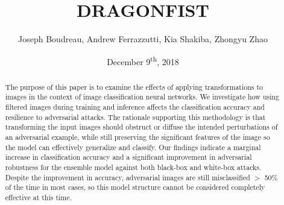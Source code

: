 \documentclass[11pt,twocolumn]{IEEEtran}
\title{DRAGONFIST}
\author{Joseph Boudreau, Andrew Ferrazzutti, Kia Shakiba, Zhongyu Zhao}
\date{December 9\textsuperscript{th}, 2018}
\begin{document}
	\maketitle

	\begin{abstract}
		The purpose of this paper is to examine the effects of applying transformations to images in the context of image classification neural networks.
		We investigate how using filtered images during training and inference affects the classification accuracy and resilience to adversarial attacks.
		The rationale supporting this methodology is that transforming the input images should obstruct or diffuse the intended perturbations of an adversarial example, while still preserving the significant features of the image so the model can effectively generalize and classify.
		Our findings indicate a marginal increase in classification accuracy and a significant improvement in adversarial robustness for the ensemble model against both black-box and white-box attacks.
		Despite the improvement in accuracy, adversarial images are still misclassified \(>\) 50\% of the time in most cases, so this model structure cannot be considered completely effective at this time.
	\end{abstract}

	
	
	
    
	
	
	
	

	
	{}

	
\end{document}
